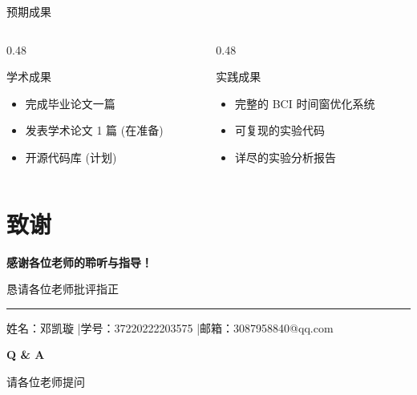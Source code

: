 \begin{frame}{预期成果}
    \begin{columns}[T]
        \begin{column}{0.48\textwidth}
            \begin{block}{\normalsize {学术成果}}
                \begin{itemize}
                    \item 完成毕业论文一篇
                    \item 发表学术论文 1 篇 (在准备)
                    \item 开源代码库 (计划)
                \end{itemize}
            \end{block}
        \end{column}

        \begin{column}{0.48\textwidth}
            \begin{block}{\normalsize {实践成果}}
                \begin{itemize}
                    \item 完整的 BCI 时间窗优化系统
                    \item 可复现的实验代码
                    \item 详尽的实验分析报告
                \end{itemize}
            \end{block}
        \end{column}
    \end{columns}
\end{frame}


\section{致谢}

\begin{frame}
    \vfill
    \centering
    {\Large\bfseries\color{white} 感谢各位老师的聆听与指导！}

    \vspace{2em}

    {\Large\color{white} 恳请各位老师批评指正}

    \vspace{2em}

    {\color{white}\rule{0.5\textwidth}{1pt}}

    \vspace{0.5em}

    {\small\color{white} 姓名：邓凯璇 \quad|\quad 学号：37220222203575 \quad|\quad 邮箱：3087958840@qq.com}
    \vfill
\end{frame}

\begin{frame}
    \vfill
    \centering
    {\Large\bfseries\color{primaryblue} Q \& A}

    \vspace{0.5em}

    {\Large\color{darkgray} 请各位老师提问}
    \vfill
\end{frame}
